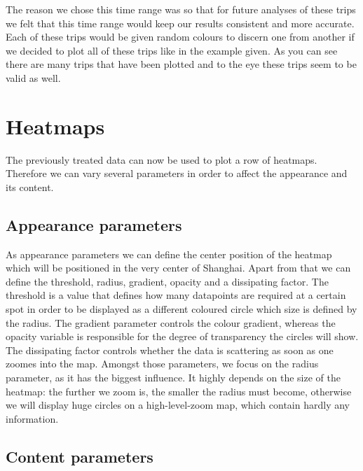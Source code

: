\documentclass[11pt,conference,a4paper,twocolumns,romanappendices]{IEEEtran}
\begin{document}
The reason we chose this time range was so that for future analyses of these trips we felt that this time range would keep our results consistent and more accurate. Each of these trips would be given random colours to discern one from another if we decided to plot all of these trips like in the example given. As you can see there are many trips that have been plotted and to the eye these trips seem to be valid as well. \\
\section{Heatmaps}
The previously treated data can now be used to plot a row of heatmaps. Therefore we can vary several parameters in order to affect the appearance and its content. \\
\subsection{Appearance parameters}
As appearance parameters we can define the center position of the heatmap which will be positioned in the very center of Shanghai. Apart from that we can define the threshold, radius, gradient, opacity and a dissipating factor. The threshold is a value that defines how many datapoints are required at a certain spot in order to be displayed as a different coloured circle which size is defined by the radius. The gradient parameter controls the colour gradient, whereas the opacity variable is responsible for the degree of transparency the circles will show. The dissipating factor controls whether the data is scattering as soon as one zoomes into the map.
Amongst those parameters, we focus on the radius parameter, as it has the biggest influence. It highly depends on the size of the heatmap: the further we zoom is, the smaller the radius must become, otherwise we will display huge circles on a high-level-zoom map, which contain hardly any information.

\subsection{Content parameters}
\end{document}

